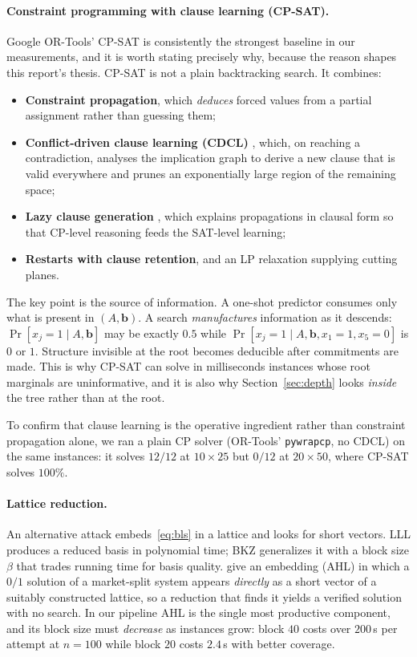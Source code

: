 \documentclass[12pt]{article}
\begin{document}
\paragraph{Constraint programming with clause learning (CP-SAT).} Google OR-Tools' CP-SAT is consistently the strongest baseline in our measurements, and it is worth stating precisely why, because the reason shapes this report's thesis. CP-SAT is not a plain backtracking search. It combines:
\begin{itemize}
\item \textbf{Constraint propagation}, which \emph{deduces} forced values from a partial assignment rather than guessing them;
\item \textbf{Conflict-driven clause learning (CDCL)} \citep{marquessilva1999grasp, moskewicz2001chaff}, which, on reaching a contradiction, analyses the implication graph to derive a new clause that is valid everywhere and prunes an exponentially large region of the remaining space;
\item \textbf{Lazy clause generation} \citep{ohrimenko2009propagation}, which explains propagations in clausal form so that CP-level reasoning feeds the SAT-level learning;
\item \textbf{Restarts with clause retention}, and an LP relaxation supplying cutting planes.
\end{itemize}

The key point is the source of information. A one-shot predictor consumes only what is present in $(A,\mathbf{b})$. A search \emph{manufactures} information as it descends: $\Pr[x_j=1\mid A,\mathbf{b}]$ may be exactly $0.5$ while $\Pr[x_j=1\mid A,\mathbf{b},x_1=1,x_5=0]$ is $0$ or $1$. Structure invisible at the root becomes deducible after commitments are made. This is why CP-SAT can solve in milliseconds instances whose root marginals are uninformative, and it is also why Section~\ref{sec:depth} looks \emph{inside} the tree rather than at the root.

To confirm that clause learning is the operative ingredient rather than constraint propagation alone, we ran a plain CP solver (OR-Tools' \texttt{pywrapcp}, no CDCL) on the same instances: it solves $12/12$ at $10\times25$ but $0/12$ at $20\times50$, where CP-SAT solves $100\%$.

\paragraph{Lattice reduction.} An alternative attack embeds~\eqref{eq:bls} in a lattice and looks for short vectors. LLL \citep{lenstra1982factoring} produces a reduced basis in polynomial time; BKZ \citep{schnorr1994lattice} generalizes it with a block size $\beta$ that trades running time for basis quality. \citet{aardal2000diophantine, aardal2000market} give an embedding (AHL) in which a $0/1$ solution of a market-split system appears \emph{directly} as a short vector of a suitably constructed lattice, so a reduction that finds it yields a verified solution with no search. In our pipeline AHL is the single most productive component, and its block size must \emph{decrease} as instances grow: block $40$ costs over $200$\,s per attempt at $n=100$ while block $20$ costs $2.4$\,s with better coverage.
\end{document}
